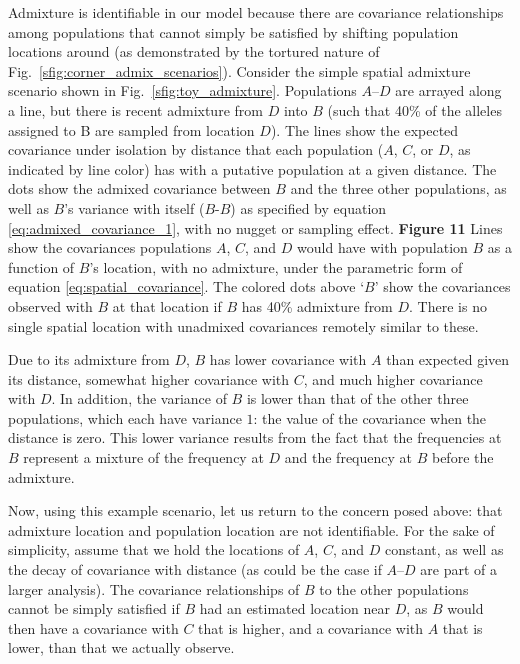 \documentclass[10pt,letterpaper]{article}
\begin{document}
Admixture is identifiable in our model because there are covariance relationships among populations that cannot simply be satisfied by shifting population locations around (as demonstrated by the tortured nature of Fig.\ \ref{sfig:corner_admix_scenarios}). 
Consider the simple spatial admixture scenario shown in Fig.\ \ref{sfig:toy_admixture}. 
Populations $A$--$D$ are arrayed  along a line, but there is recent admixture from $D$ into $B$ (such that 40\% of the alleles assigned to B are sampled from location $D$).  
The lines show the expected covariance under isolation by distance that each population ($A$, $C$, or $D$, as indicated by line color) has with a putative population at a given distance.  The dots show the admixed covariance between $B$ and the three other populations, as well as $B$'s variance with itself ($B$-$B$) as specified by equation \eqref{eq:admixed_covariance_1}, with no nugget or sampling effect.
%
\newline\newline
{\bf{Figure 11}}    Lines show the covariances populations $A$, $C$, and $D$ would have with population $B$ as a function of $B$'s location,
    with no admixture,
    under the parametric form of equation \eqref{eq:spatial_covariance}.
    The colored dots above `$B$' show the covariances observed with $B$ at that location if $B$ has 40\% admixture from $D$.
    There is no single spatial location with unadmixed covariances remotely similar to these.
\newline\newline

Due to its admixture from $D$, $B$ has lower covariance with $A$ than expected given its distance, somewhat higher covariance with $C$, and much higher covariance with $D$. In addition, the variance of $B$ is lower than that of the other three populations, which each have variance $1$: the value of the covariance when the distance is zero. This lower variance results from the fact that the frequencies at $B$ represent a mixture of the frequency at $D$ and the frequency at $B$ before the admixture. 

Now, using this example scenario, let us return to the concern posed above: that admixture location and population location are not identifiable.  For the sake of simplicity, assume that we hold the locations of $A$, $C$, and $D$ constant, as well as the decay of covariance with distance (as could be the case if $A$--$D$ are part of a larger analysis).  The covariance relationships of $B$ to the other populations cannot be simply satisfied if $B$ had an estimated location near $D$, as $B$ would then have a covariance with $C$ that is higher, and a covariance with $A$ that is lower, than that we actually observe. 
\end{document}
